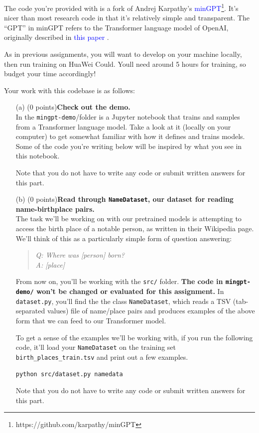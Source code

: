 \documentclass[letterpaper,12pt]{article}
\begin{document}
	\noindent The code you're provided with is a fork of Andrej Karpathy's \textcolor{blue}{minGPT\footnote{https://github.com/karpathy/minGPT}}. It's nicer than most research code in that it's relatively simple and transparent. The “GPT” in minGPT refers to the Transformer language model of OpenAI, originally described in \textcolor{blue}{this paper} \cite{b1}.
	
	\noindent As in previous assignments, you will want to develop on your machine locally, then run training on HuaWei Could. Youll need around 5 hours for training, so budget your time accordingly!

	\noindent Your work with this codebase is as follows:
	
	\begin{itemize}
	\item[(a)]
		(0 points)\textbf{Check out the demo.}\\
		In  the \texttt{mingpt-demo}/folder is a Jupyter notebook that trains and samples from a Transformer language model. Take a look at it (locally on your computer) to get somewhat familiar with how it defines and trains models. Some of the code you're writing below will be inspired by what you see in this notebook.
		
		Note that you do not have to write any code or submit written answers for this part.
		
	\item[(b)]
		(0 points)\textbf{Read through \texttt{NameDataset}, our dataset for reading name-birthplace pairs.}\\
		The task we'll be working on with our pretrained models is attempting to access the birth place of a notable person, as written in their Wikipedia page.
		We'll think of this as a particularly simple form of question answering:
		\begin{quote}
			\textit{Q: Where was \textit{[person]} born?}\\
			\textit{A: [place]}
		\end{quote}
		From now on, you'll be working with the \texttt{src/} folder. \textbf{The code in \texttt{mingpt-demo/} won't be changed or evaluated for this assignment.}
		In \texttt{dataset.py}, 
		you'll find the the class \texttt{NameDataset}, which reads a TSV (tab-separated values) file of name/place pairs and produces examples of the above form that we can feed to our Transformer model.
		
		To get a sense of the examples we'll be working with, if you run the following code, it'll load your \texttt{NameDataset} on the training set \texttt{birth\_places\_train.tsv} and print out a few examples.
		\begin{lstlisting}[language=bash]
			python src/dataset.py namedata 
		\end{lstlisting}
		Note that you do not have to write any code or submit written answers for this part.
		

\end{itemize}
\end{document}
